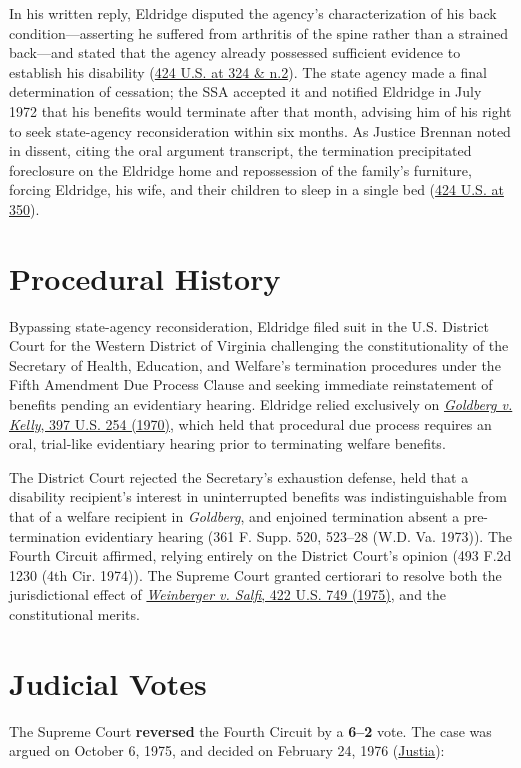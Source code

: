 \documentclass[12pt]{article}
\begin{document}
In his written reply, Eldridge disputed the agency's characterization of his back condition---asserting he suffered from arthritis of the spine rather than a strained back---and stated that the agency already possessed sufficient evidence to establish his disability (\href{https://supreme.justia.com/cases/federal/us/424/319/}{424 U.S. at 324 \& n.2}). The state agency made a final determination of cessation; the SSA accepted it and notified Eldridge in July 1972 that his benefits would terminate after that month, advising him of his right to seek state-agency reconsideration within six months. As Justice Brennan noted in dissent, citing the oral argument transcript, the termination precipitated foreclosure on the Eldridge home and repossession of the family's furniture, forcing Eldridge, his wife, and their children to sleep in a single bed (\href{https://supreme.justia.com/cases/federal/us/424/319/}{424 U.S. at 350}).

\section{Procedural History}
Bypassing state-agency reconsideration, Eldridge filed suit in the U.S. District Court for the Western District of Virginia challenging the constitutionality of the Secretary of Health, Education, and Welfare's termination procedures under the Fifth Amendment Due Process Clause and seeking immediate reinstatement of benefits pending an evidentiary hearing. Eldridge relied exclusively on \href{https://supreme.justia.com/cases/federal/us/397/254/}{\emph{Goldberg v. Kelly}, 397 U.S. 254 (1970)}, which held that procedural due process requires an oral, trial-like evidentiary hearing prior to terminating welfare benefits.

The District Court rejected the Secretary's exhaustion defense, held that a disability recipient's interest in uninterrupted benefits was indistinguishable from that of a welfare recipient in \emph{Goldberg}, and enjoined termination absent a pre-termination evidentiary hearing (361 F. Supp. 520, 523--28 (W.D. Va. 1973)). The Fourth Circuit affirmed, relying entirely on the District Court's opinion (493 F.2d 1230 (4th Cir. 1974)). The Supreme Court granted certiorari to resolve both the jurisdictional effect of \href{https://supreme.justia.com/cases/federal/us/422/749/}{\emph{Weinberger v. Salfi}, 422 U.S. 749 (1975)}, and the constitutional merits.

\section{Judicial Votes}
The Supreme Court \textbf{reversed} the Fourth Circuit by a \textbf{6--2} vote. The case was argued on October 6, 1975, and decided on February 24, 1976 (\href{https://supreme.justia.com/cases/federal/us/424/319/}{Justia}):
\end{document}

